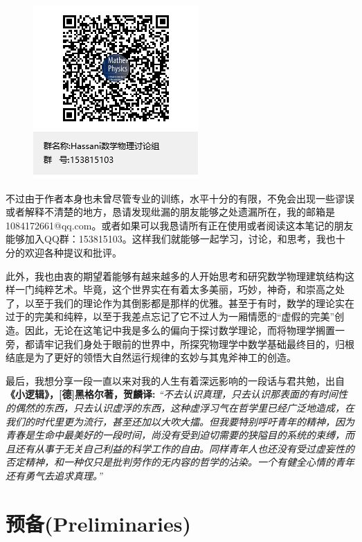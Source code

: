 \documentclass[mathserif,hyperref,UTF8,openany,b5paper]{ctexbook}
\begin{document}
\begin{figure}
\centering
\includegraphics[scale=0.4]{qq.png}
\end{figure}
\thispagestyle{empty}
不过由于作者本身也未曾尽管专业的训练，水平十分的有限，不免会出现一些谬误或者解释不清楚的地方，恳请发现纰漏的朋友能够之处遗漏所在，我的邮箱是1084172661@qq.com。或者如果可以我恳请所有正在使用或者阅读这本笔记的朋友能够加入QQ群：153815103。这样我们就能够一起学习，讨论，和思考，我也十分的欢迎各种提议和批评。

此外，我也由衷的期望着能够有越来越多的人开始思考和研究数学物理建筑结构这样一门纯粹艺术。毕竟，这个世界实在有着太多美丽，巧妙，神奇，和崇高之处了，以至于我们的理论作为其倒影都是那样的优雅。甚至于有时，数学的理论实在过于的完美和纯粹，以至于我差点忘记了它不过人为一厢情愿的“虚假的完美”创造。因此，无论在这笔记中我是多么的偏向于探讨数学理论，而将物理学搁置一旁，都请牢记我们身处于眼前的世界中，所探究物理学中数学基础最终目的，归根结底是为了更好的领悟大自然运行规律的玄妙与其鬼斧神工的创造。

\thispagestyle{empty}
最后，我想分享一段一直以来对我的人生有着深远影响的一段话与君共勉，出自\textbf{《小逻辑》，[德]黑格尔著，贺麟译:} \textit{ “不去认识真理，只去认识那表面的有时间性的偶然的东西，只去认识虚浮的东西，这种虚浮习气在哲学里已经广泛地造成，在我们的时代里更为流行，甚至还加以大吹大擂。但我要特别呼吁青年的精神，因为青春是生命中最美好的一段时间，尚没有受到迫切需要的狭隘目的系统的束缚，而且还有从事于无关自己利益的科学工作的自由。同样青年人也还没有受过虚妄性的否定精神，和一种仅只是批判劳作的无内容的哲学的沾染。一个有健全心情的青年还有勇气去追求真理。”}
\thispagestyle{empty}
\tableofcontents
\thispagestyle{empty}
\chapter{预备(Preliminaries)}
\end{document}
